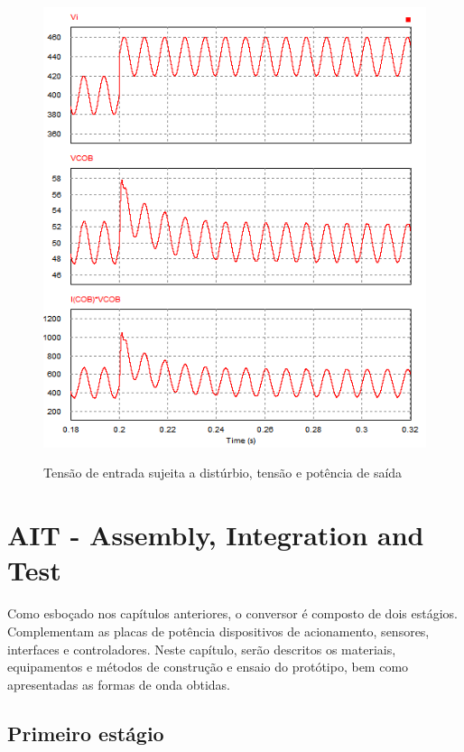 \documentclass[
        12pt,
        openany, %
        oneside, %
        a4paper,			
        english,			
        brazil
        ]{abntbibufjf}
\begin{document}
\begin{figure}[!h]
	\centering
	\caption{Tensão de entrada sujeita a distúrbio, tensão e potência de saída}
	\includegraphics[scale=.75]{../GRAFICOS/pc_disturb.PNG}\\
	\label{stage2_ctrl}
\end{figure}




\chapter{AIT - Assembly, Integration and Test}

Como esboçado nos capítulos anteriores, o conversor é composto de dois estágios. Complementam as placas de potência dispositivos de acionamento, sensores, interfaces e controladores. Neste capítulo, serão descritos os materiais, equipamentos e métodos de construção e ensaio do protótipo, bem como apresentadas as formas de onda obtidas.

\section{Primeiro estágio}
\end{document}
